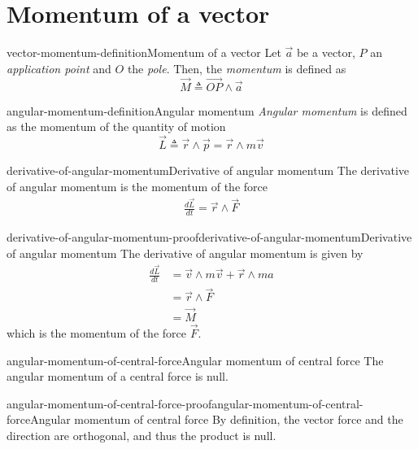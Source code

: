 \documentclass[preview]{standalone}
\begin{document}
\genpage

\section{Momentum of a vector}

\begin{snippetdefinition}{vector-momentum-definition}{Momentum of a vector}
    Let \(\vec{a}\) be a vector, \(P\) an \emph{application point}
    and \(O\) the \emph{pole}. Then, the \emph{momentum} is defined as
    \[
        \vec{M} \triangleq \vec{OP} \wedge \vec{a}
    \]
\end{snippetdefinition}

\begin{snippetdefinition}{angular-momentum-definition}{Angular momentum}
    \emph{Angular momentum} is defined as the momentum of the quantity of motion
    \[
        \vec{L} \triangleq \vec{r} \wedge \vec{p} = \vec{r} \wedge m\vec{v}
    \]
\end{snippetdefinition}

\begin{snippetproposition}{derivative-of-angular-momentum}{Derivative of angular momentum}
    The derivative of angular momentum is the momentum of the force
    \begin{align*}
        \frac{d\vec{L}}{dt} = \vec{r} \wedge \vec{F} 
    \end{align*}
\end{snippetproposition}

\begin{snippetproof}{derivative-of-angular-momentum-proof}{derivative-of-angular-momentum}{Derivative of angular momentum}
    The derivative of angular momentum is given by
    \begin{align*}
        \frac{d\vec{L}}{dt} &= \vec{v} \wedge m\vec{v} + \vec{r} \wedge ma \\
        &= \vec{r} \wedge \vec{F} \\
        &= \vec{M}
    \end{align*}
    which is the momentum of the force \(\vec{F}\).
\end{snippetproof}

\begin{snippetproposition}{angular-momentum-of-central-force}{Angular momentum of central force}
    The angular momentum of a central force is null.
\end{snippetproposition}

\begin{snippetproof}{angular-momentum-of-central-force-proof}{angular-momentum-of-central-force}{Angular momentum of central force}
    By definition, the vector force and the direction are orthogonal, and thus the product is null.
\end{snippetproof}
\end{document}
